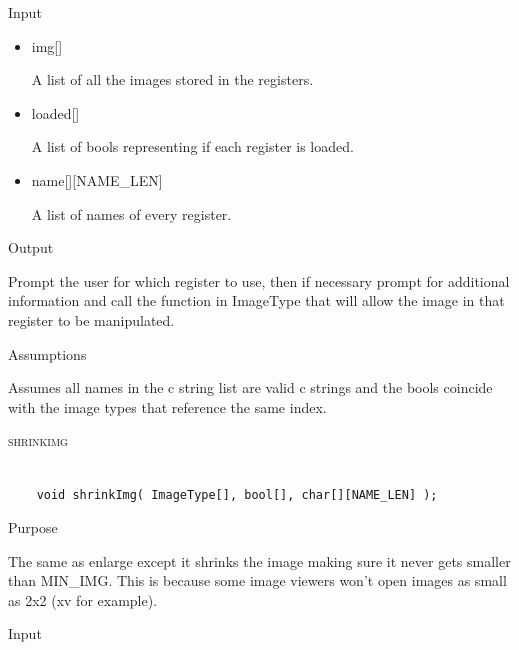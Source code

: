 \documentclass[pdftex, 11pt]{article}
\begin{document}
\begin{description}
\begin{description}
			\item{Input}

				\begin{itemize}

					\item{img[]}

						A list of all the images stored in the registers.

					\item{loaded[]}

						A list of bools representing if each register is loaded.

					\item{name[][NAME\_LEN]}

						A list of names of every register.

				\end{itemize}

			\item{Output}

				Prompt the user for which register to use, then if necessary
				prompt for additional information and call the function
				in ImageType that will allow the image in that register to
				be manipulated.

			\item{Assumptions}

				Assumes all names in the c string list are valid c
				strings and the bools coincide with the image types that
				reference the same index.

		\end{description}



	\item{\textsc{shrinkimg}}

		\begin{lstlisting}

	void shrinkImg( ImageType[], bool[], char[][NAME_LEN] );
		\end{lstlisting}

		\begin{description}
			\item{Purpose}

				The same as enlarge except it shrinks the image making sure it never gets
				smaller than MIN\_IMG.  This is because some image viewers won't open images
				as small as 2x2 (xv for example).

			\item{Input}

				\begin{itemize}


\end{itemize}
\end{description}
\end{description}
\end{document}
